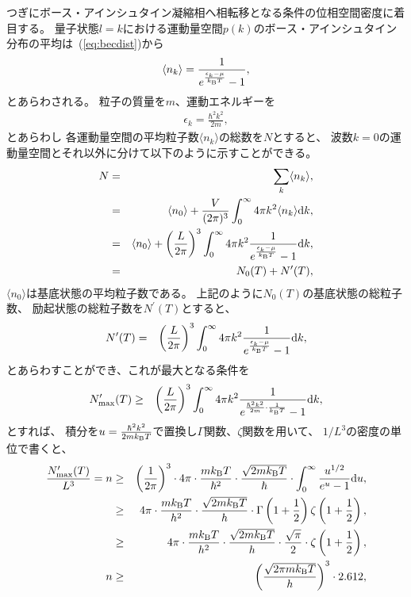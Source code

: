 \documentclass[12pt,a4paper]{jbook}
\newcommand{\diff}{\mathrm{d}}				%
\newcommand{\kb} {k_{\rm B}}				%
\begin{document}
        	つぎにボース・アインシュタイン凝縮相へ相転移となる条件の位相空間密度に着目する。
        	量子状態$l=k$における運動量空間$p(k)$のボース・アインシュタイン分布の平均は~(\ref{eq:becdist})から
        	\begin{eqnarray}
		    \langle n_k \rangle = \frac{1}{e^{\frac{\epsilon_k - \mu}{\kb T}} - 1},
        	\end{eqnarray}
        	とあらわされる。
        	粒子の質量を$m$、運動エネルギーを
        	\begin{eqnarray}
		    \epsilon_k = \frac{\hbar^2 k^2}{2 m},
        	\end{eqnarray}
        	とあらわし
        	各運動量空間の平均粒子数$\langle n_k \rangle$の総数を$N$とすると、
        	波数$k=0$の運動量空間とそれ以外に分けて以下のように示すことができる。
		\begin{eqnarray}
			N & = & \sum_k \langle n_k \rangle, \nonumber
			\\
			& = & \langle n_0 \rangle  + \frac{V}{(2\pi)^3} \int_0^\infty 4 \pi k^2 
			\langle n_k \rangle \diff k, \nonumber
			\\
			& = & \langle n_0 \rangle + \left( \frac{L}{2\pi} \right)^3 \int_0^\infty 4 \pi k^2
			\frac{1}{e^{\frac{\epsilon_k - \mu}{\kb T}} - 1} \diff k, \nonumber
			\\
			& = & N_0(T) + N^\prime(T),
		\end{eqnarray}
		$\langle n_0 \rangle$は基底状態の平均粒子数である。
		上記のように$N_0(T)$の基底状態の総粒子数、
        	励起状態の総粒子数を$N^\prime(T)$とすると、
		\begin{eqnarray}
			N^\prime(T) & = & \left(\frac{L}{2 \pi}\right)^3 \int_0^\infty 4 \pi k^2
			 \frac{1}{e^{\frac{\epsilon_k - \mu}{\kb T}} - 1}  \diff k,
		\end{eqnarray}
        	とあらわすことができ、これが最大となる条件を
		\begin{eqnarray}
			N^\prime_{{\rm max}}(T) & \ge & \left(\frac{L}{2 \pi}\right)^3 \int_0^\infty 4 \pi k^2
			 \frac{1}{e^{\frac{\hbar^2 k^2}{2 m} \cdot \frac{1}{\kb T}} - 1}  \diff k,
		\end{eqnarray}
        	とすれば、
		積分を$u = \frac{\hbar^2 k^2}{2 m \kb T}$で置換し$\Gamma$関数、$\zeta$関数を用いて、
        	$1/L^3$の密度の単位で書くと、
		\begin{eqnarray}
			\frac{N^\prime_{{\rm max}}(T)}{L^3} = n  & \ge & \left(\frac{1}{2 \pi} \right)^3 \cdot
			4 \pi \cdot \frac{m \kb T}{\hbar^2} \cdot \frac{\sqrt{2 m \kb T}}{\hbar} \cdot
			\int_0^\infty \frac{u^{1/2}}{e^u - 1} \diff u,
			\\
			& \ge & 4 \pi \cdot \frac{m \kb T}{h^2} \cdot \frac{\sqrt{2 m \kb T}}{h}
			\cdot \Gamma \left( 1+\frac{1}{2}\right) \zeta \left( 1+\frac{1}{2}\right), \nonumber
			\\
			& \ge & 4 \pi \cdot \frac{m \kb T}{h^2} \cdot \frac{\sqrt{2 m \kb T}}{h}
			\cdot \frac{\sqrt{\pi}}{2}\cdot \zeta \left( 1+\frac{1}{2}\right), \nonumber
			\\
			n & \ge & \left( \frac{\sqrt{2 \pi m \kb T}}{h} \right)^{3} \cdot 2.612,
		\end{eqnarray}
\end{document}
